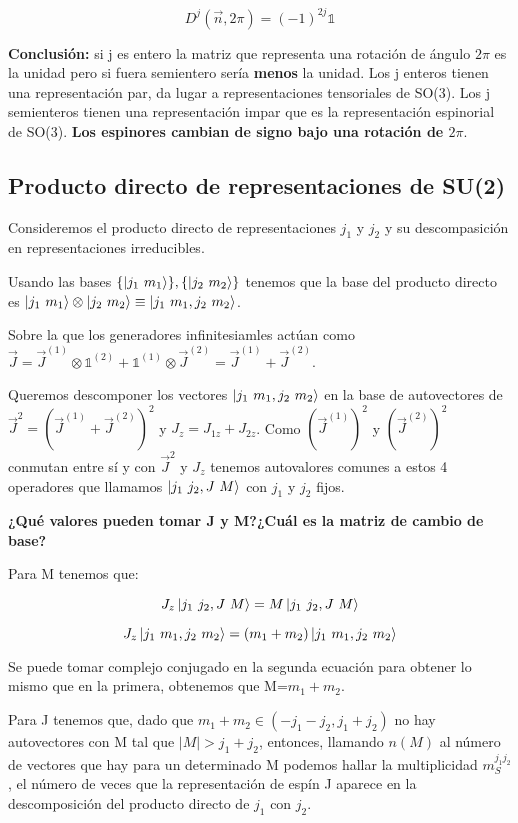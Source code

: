 \documentclass{article}
\begin{document}
        $$D^j(\Vec{n},2\pi)=(-1)^{2j}\mathds{1}$$

        \textbf{Conclusión:} si j es entero la matriz que representa una rotación de ángulo $2\pi$ es la unidad pero si fuera semientero sería \textbf{menos} la unidad. Los j enteros tienen una representación par, da lugar a representaciones tensoriales de SO(3). Los j semienteros tienen una representación impar que es la representación espinorial de SO(3). \textbf{Los espinores cambian de signo bajo una rotación de $2\pi$}.


        \subsection{Producto directo de representaciones de SU(2)}

        Consideremos el producto directo de representaciones $j_1$ y $ j_2$ y su descompasición en representaciones irreducibles.

        Usando las bases $\{ \ket{j_1 \ m_1}\}, \{ \ket{j_2 \ m_2} \}$ tenemos que la base del producto directo es $ \ket{j_1 \ m_1} \otimes \ket{j_2 \ m_2} \equiv \ket{ j _1 \ m_1 , j_2 \ m_2}$.

        Sobre la que los generadores infinitesiamles actúan como $\Vec{J}= \Vec{J}^{(1)}\otimes \mathds{1}^{(2)} + \mathds{1}^{(1)}\otimes \Vec{J}^{(2)} =\Vec{J}^{(1)} + \Vec{J}^{(2)}$.

        \smallskip
        Queremos descomponer los vectores $\ket{ j _1 \ m_1 , j_2 \ m_2}$ en la base de autovectores de $\Vec{J}^2=(\Vec{J}^{(1)} + \Vec{J}^{(2)})^2$ y $J_z=J_{1z}+J_{2z}$. Como $\left ( \Vec{J}^{(1)}\right)^2$ y $\left ( \Vec{J}^{(2)}\right)^2$ conmutan entre sí y con $\Vec{J}^2$ y $J_z$ tenemos autovalores comunes a estos 4 operadores que llamamos $\ket{j_1 \ j_2 , J \ M}$ con $j_1$ y $j_2$ fijos.

        \bigskip
        \textbf{¿Qué valores pueden tomar J y M?}\textbf{¿Cuál es la matriz de cambio de base?}

        \smallskip
        Para M tenemos que:

        $$J_z\ket{j_1 \ j_2 , J \ M} = M \ket{j_1 \ j_2 , J \ M}$$

        $$J_z\ket{j_1 \ m_1 , j_2 \ m_2}=(m_1+m_2)\ket{j_1 \ m_1 , j_2 \ m_2}$$

        Se puede tomar complejo conjugado en la segunda ecuación para obtener lo mismo que en la primera, obtenemos que M=$m_1+m_2$.

        \smallskip
        Para J tenemos que, dado que $m_1+m_2 \in (-j_1-j_2,j_1+j_2)$ no hay autovectores con M tal que $|M|>j_1+j_2$, entonces, llamando $n(M)$ al número de vectores que hay para un determinado M podemos hallar la multiplicidad $m_S^{j_1j_2}$, el número de veces que la representación de espín J aparece en la descomposición del producto directo de $j_1$ con $j_2$.
\end{document}
